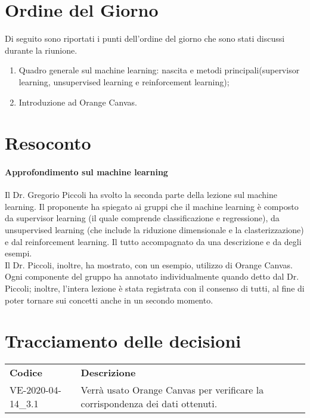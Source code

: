 \documentclass{article}
\begin{document}
\section{Ordine del Giorno}%
\label{ordine_del_giorno}
Di seguito sono riportati i punti dell'ordine del giorno che sono stati discussi durante la riunione.
\begin{enumerate}
\item Quadro generale sul machine learning: nascita e metodi principali(supervisor learning, unsupervised learning e reinforcement learning);
\item Introduzione ad Orange Canvas.
\end{enumerate}

\section{Resoconto}%
\label{resoconto}
\paragraph*{Approfondimento sul machine learning}
Il Dr. Gregorio Piccoli ha svolto la seconda parte della lezione sul machine learning. Il proponente ha spiegato ai gruppi che il machine learning è composto da supervisor learning (il quale comprende classificazione e regressione), da unsupervised learning (che include la riduzione dimensionale e la clasterizzazione) e dal reinforcement learning. Il tutto accompagnato da una descrizione e da degli esempi. \\
Il Dr. Piccoli, inoltre, ha mostrato, con un esempio, utilizzo di Orange Canvas.\\
Ogni componente del gruppo ha annotato individualmente quando detto dal Dr. Piccoli; inoltre, l'intera lezione è stata registrata con il consenso di tutti, al fine di poter tornare sui concetti anche in un secondo momento.


\section{Tracciamento delle decisioni}
\begin{table}[H]
  \centering
  \begin{tabular}{p{4cm}|p{12cm}}
    \rowcolor{lightgray}
    \textbf{Codice} & \textbf{Descrizione}      \\
    VE-2020-04-14\_3.1 & Verrà usato Orange Canvas per verificare la corrispondenza dei dati ottenuti.
  \end{tabular}
\end{table}
\end{document}

